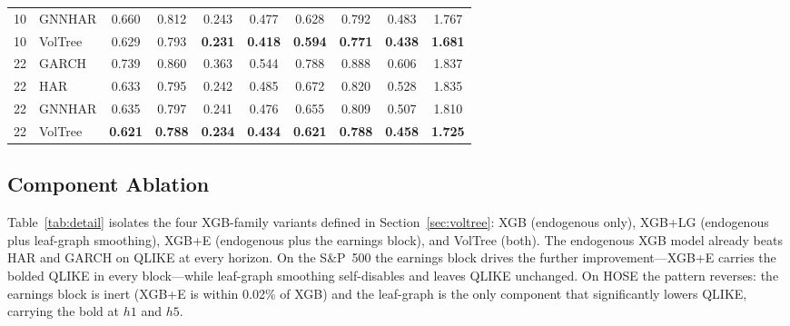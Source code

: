 \documentclass[runningheads]{llncs}
\begin{document}
\begin{table}[t]
\begin{tabular}{ll cccc cccc}
10 & GNNHAR   & 0.660 & 0.812 & 0.243 & 0.477 & 0.628 & 0.792 & 0.483 & 1.767 \\
10 & VolTree & 0.629 & 0.793 & \textbf{0.231} & \textbf{0.418} & \textbf{0.594} & \textbf{0.771} & \textbf{0.438} & \textbf{1.681} \\
\midrule
22 & GARCH    & 0.739 & 0.860 & 0.363 & 0.544 & 0.788 & 0.888 & 0.606 & 1.837 \\
22 & HAR      & 0.633 & 0.795 & 0.242 & 0.485 & 0.672 & 0.820 & 0.528 & 1.835 \\
22 & GNNHAR   & 0.635 & 0.797 & 0.241 & 0.476 & 0.655 & 0.809 & 0.507 & 1.810 \\
22 & VolTree & \textbf{0.621} & \textbf{0.788} & \textbf{0.234} & \textbf{0.434} & \textbf{0.621} & \textbf{0.788} & \textbf{0.458} & \textbf{1.725} \\
\bottomrule
\end{tabular}
\end{table}

\subsection{Component Ablation}
Table~\ref{tab:detail} isolates the four XGB-family variants defined in Section~\ref{sec:voltree}: XGB
(endogenous only), XGB+LG (endogenous plus leaf-graph smoothing), XGB+E (endogenous plus the earnings
block), and VolTree (both). The endogenous XGB model already beats HAR and GARCH on QLIKE at every
horizon. On the S\&P~500 the earnings block drives the further improvement---XGB+E carries the bolded
QLIKE in every block---while leaf-graph smoothing self-disables and leaves QLIKE unchanged. On HOSE the
pattern reverses: the earnings block is inert (XGB+E is within 0.02\% of XGB) and the leaf-graph is the
only component that significantly lowers QLIKE, carrying the bold at $h1$ and $h5$.
\end{document}
